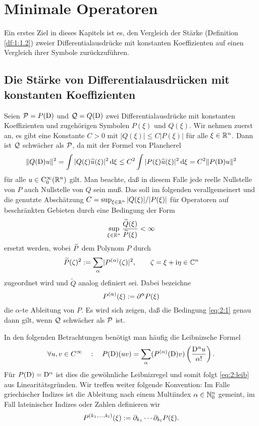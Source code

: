 \chapter{Minimale Operatoren}

Ein erstes Ziel in dieses Kapitels ist es, den Vergleich der Stärke (Definition \ref{df:1:1.2})
zweier Differentialausdrücke mit konstanten Koeffizienten auf einen Vergleich ihrer Symbole zurückzuführen.

\section{Die Stärke von Differentialausdrücken mit konstanten Koeffizienten}

Seien $\mathcal P=P(\mathrm D)$ und $\mathcal Q=Q(\mathrm D)$ zwei Differentialausdrücke mit konstanten Koeffizienten und zugehörigen Symbolen $P(\xi)$ und $Q(\xi)$. Wir nehmen zuerst an, es gibt eine Konstante $C>0$ mit $|Q(\xi)|\le C|P(\xi)|$ für alle $\xi\in\mathbb R^n$. Dann ist $\mathcal Q$ schwächer als $\mathcal P$, da mit der Formel von Plancherel 
\begin{equation}
    \|Q(\mathrm D) u\|^2 = \int |Q(\xi)\widehat u(\xi)|^2 \,\mathrm d\xi \le C^2 \int |P(\xi)\widehat u(\xi)|^2 \,\mathrm d\xi = C^2 \|P(\mathrm D)u \|^2 
\end{equation}
für alle $u\in\mathrm C_0^\infty(\mathbb R^n)$ gilt. Man beachte, daß in diesem Falle jede reelle Nullstelle von $P$ auch Nullstelle von $Q$ sein muß. Das soll im folgenden verallgemeinert und die genutzte Abschätzung $C=\sup_{\xi\in\mathbb R^n} |Q(\xi)|/|P(\xi)|$ für Operatoren auf beschränkten Gebieten  durch eine Bedingung der Form
\begin{equation}\label{eq:2:1}
\sup_{\xi\in\mathbb R^n}\frac{\widetilde{Q}(\xi)}{\widetilde{P}(\xi)}<\infty
\end{equation}
ersetzt werden, wobei $\widetilde{P}$ dem Polynom $P$ durch
\begin{equation}\label{eq:2:2}
\widetilde{P}(\zeta)^2:=\sum_\alpha\lvert P^{(\alpha)}(\zeta)\rvert^2,\qquad \zeta=\xi+\mathrm i\eta \in\mathbb C^n
\end{equation}
zugeordnet wird und $\widetilde Q$ analog definiert sei. Dabei bezeichne 
\begin{equation}
P^{(\alpha)}(\xi):=\partial^\alpha P(\xi)
\end{equation}
die $\alpha$-te Ableitung von $P$. Es wird sich zeigen, daß die Bedingung \eqref{eq:2:1} genau dann gilt, wenn $\mathcal Q$ schwächer als $\mathcal P$ ist.

In den folgenden Betrachtungen benötigt man häufig die Leibnizsche Formel
\begin{equation}\label{eq:2:leib}
\forall u,v\in C^\infty \quad:\quad P(\mathrm D)(uv)=\sum_{\alpha}(P^{(\alpha)}(\mathrm D)v)\left(\frac{\mathrm D^\alpha u}{\alpha!}\right).
\end{equation} 
Für $P(\mathrm D)=\mathrm D^\alpha$ ist dies die gewöhnliche Leibnizregel und somit folgt \eqref{eq:2:leib} aus Linearitätsgründen. Wir treffen weiter folgende Konvention:
Im Falle griechischer Indizes
ist die Ableitung nach einem Multiindex $\alpha\in\mathbb N^n_0$ gemeint,
im Fall lateinischer Indizes oder Zahlen definieren wir
\begin{equation}
P^{(k_1,\dots,k_l)}(\xi):=\partial_{k_1}\cdots\partial_{k_l}P(\xi).
\end{equation}

